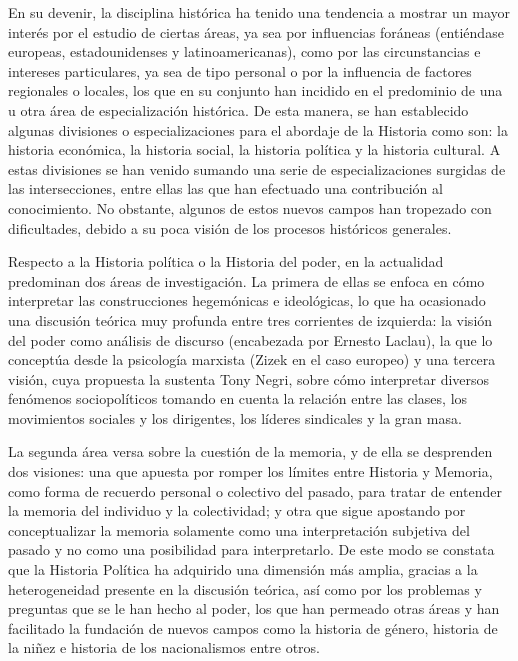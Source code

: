 En su devenir, la disciplina histórica ha tenido una tendencia a mostrar un
mayor interés por el estudio de ciertas áreas, ya sea por influencias
foráneas (entiéndase europeas, estadounidenses y latinoamericanas), como
por las circunstancias e intereses particulares, ya sea de tipo personal o
por la influencia de factores regionales o locales, los que en su conjunto
han incidido en el predominio de una u otra área de especialización
histórica. De esta manera, se han establecido algunas divisiones o
especializaciones para el abordaje de la Historia como son: la historia
económica, la historia social, la historia política y la historia cultural.
A estas divisiones se han venido sumando una serie de especializaciones
surgidas de las intersecciones, entre ellas las que han efectuado una
contribución al conocimiento. No obstante, algunos de estos nuevos campos
han tropezado con dificultades, debido a su poca visión de los procesos
históricos generales. 

\enlargethispage{1\baselineskip}
Respecto a la Historia política o la Historia del poder, en la actualidad
predominan dos áreas de investigación. La primera de ellas se enfoca en
cómo interpretar las construcciones hegemónicas e ideológicas, lo que ha
ocasionado una discusión teórica muy profunda entre tres corrientes de
izquierda: la visión del poder como análisis de discurso  (encabezada por
Ernesto Laclau), la que lo conceptúa desde la psicología marxista (Zizek en
el caso europeo) y una tercera visión, cuya propuesta la sustenta Tony Negri,
sobre cómo interpretar diversos fenómenos sociopolíticos tomando en cuenta
la relación entre las clases, los movimientos sociales y los dirigentes,
los líderes sindicales y la gran masa. 

La segunda área versa sobre la cuestión de la memoria, y de ella se
desprenden dos visiones: una que apuesta por romper los límites entre
Historia y Memoria, como forma de recuerdo personal o colectivo del pasado,
para tratar de entender la memoria del individuo y la colectividad; y otra
que sigue apostando por conceptualizar la memoria solamente como una
interpretación subjetiva del pasado y no como una posibilidad para
interpretarlo. De este modo se constata que la Historia Política ha
adquirido una dimensión más amplia, gracias a la heterogeneidad presente en
la discusión teórica, así como por los problemas y preguntas que se le han
hecho al poder, los que han permeado otras áreas y han facilitado la
fundación de nuevos campos como la historia de género, historia de la niñez
e historia de los nacionalismos entre otros.


